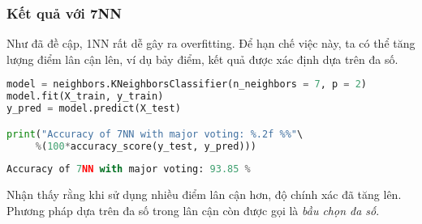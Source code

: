 



\subsubsection{Kết quả với 7NN}
Như đã đề cập, 1NN rất dễ gây ra overfitting. Để hạn chế việc này, ta có thể
tăng lượng điểm lân cận lên, ví dụ bảy điểm, kết quả được xác định dựa trên đa
số.

\begin{lstlisting}[language=Python]
model = neighbors.KNeighborsClassifier(n_neighbors = 7, p = 2)
model.fit(X_train, y_train)
y_pred = model.predict(X_test)

print("Accuracy of 7NN with major voting: %.2f %%"\ 
     %(100*accuracy_score(y_test, y_pred)))

\end{lstlisting}
\kq
\begin{lstlisting}[language=Python]
Accuracy of 7NN with major voting: 93.85 %
\end{lstlisting}

Nhận thấy rằng khi sử dụng nhiều điểm lân cận hơn, độ chính xác đã tăng lên. Phương pháp dựa trên đa số trong lân cận còn được gọi là \textit{bầu chọn đa số}.


